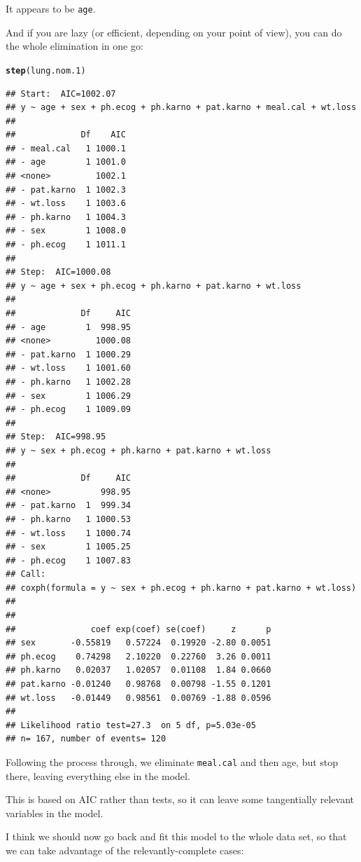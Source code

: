 \documentclass{article}\usepackage[]{graphicx}\usepackage[]{color}
\makeatletter
\newcommand{\hlstd}[1]{\textcolor[rgb]{0.345,0.345,0.345}{#1}}%
\newcommand{\hlkwd}[1]{\textcolor[rgb]{0.737,0.353,0.396}{\textbf{#1}}}%
\newenvironment{kframe}{%
 \def\at@end@of@kframe{}%
 \ifinner\ifhmode%
  \def\at@end@of@kframe{\end{minipage}}%
  \begin{minipage}{\columnwidth}%
 \fi\fi%
 \def\FrameCommand##1{\hskip\@totalleftmargin \hskip-\fboxsep
 \colorbox{shadecolor}{##1}\hskip-\fboxsep
     \hskip-\linewidth \hskip-\@totalleftmargin \hskip\columnwidth}%
 \MakeFramed {\advance\hsize-\width
   \@totalleftmargin\z@ \linewidth\hsize
   \@setminipage}}%
 {\par\unskip\endMakeFramed%
 \at@end@of@kframe}
\newenvironment{knitrout}{}{} %
\makeatother
\begin{document}
It appears to be \texttt{age}.

And if you are lazy (or efficient, depending on your point of view),
you can do the whole elimination in one go:

\begin{knitrout}
\color{fgcolor}\begin{kframe}
\begin{alltt}
\hlkwd{step}\hlstd{(lung.nom.1)}
\end{alltt}
\begin{verbatim}
## Start:  AIC=1002.07
## y ~ age + sex + ph.ecog + ph.karno + pat.karno + meal.cal + wt.loss
## 
##             Df    AIC
## - meal.cal   1 1000.1
## - age        1 1001.0
## <none>         1002.1
## - pat.karno  1 1002.3
## - wt.loss    1 1003.6
## - ph.karno   1 1004.3
## - sex        1 1008.0
## - ph.ecog    1 1011.1
## 
## Step:  AIC=1000.08
## y ~ age + sex + ph.ecog + ph.karno + pat.karno + wt.loss
## 
##             Df     AIC
## - age        1  998.95
## <none>         1000.08
## - pat.karno  1 1000.29
## - wt.loss    1 1001.60
## - ph.karno   1 1002.28
## - sex        1 1006.29
## - ph.ecog    1 1009.09
## 
## Step:  AIC=998.95
## y ~ sex + ph.ecog + ph.karno + pat.karno + wt.loss
## 
##             Df     AIC
## <none>          998.95
## - pat.karno  1  999.34
## - ph.karno   1 1000.53
## - wt.loss    1 1000.74
## - sex        1 1005.25
## - ph.ecog    1 1007.83
## Call:
## coxph(formula = y ~ sex + ph.ecog + ph.karno + pat.karno + wt.loss)
## 
## 
##               coef exp(coef) se(coef)     z      p
## sex       -0.55819   0.57224  0.19920 -2.80 0.0051
## ph.ecog    0.74298   2.10220  0.22760  3.26 0.0011
## ph.karno   0.02037   1.02057  0.01108  1.84 0.0660
## pat.karno -0.01240   0.98768  0.00798 -1.55 0.1201
## wt.loss   -0.01449   0.98561  0.00769 -1.88 0.0596
## 
## Likelihood ratio test=27.3  on 5 df, p=5.03e-05
## n= 167, number of events= 120
\end{verbatim}
\end{kframe}
\end{knitrout}

Following the process through, we eliminate \texttt{meal.cal} and then
age, but stop there,
leaving everything else in the model.

This is based on AIC rather than tests, so it can leave some
tangentially relevant variables in the model. 

I think we should now go back and fit this model to the whole data
set, so that we can take advantage of the relevantly-complete cases:
\end{document}
